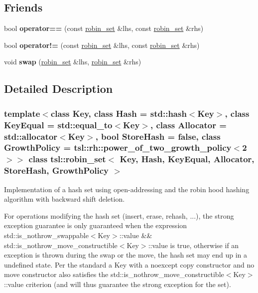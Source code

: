 \subsection*{Friends}
\begin{DoxyCompactItemize}
\item 
\mbox{\label{classtsl_1_1robin__set_a55606bf1468f27f0d3b49785b48259f9}} 
bool {\bfseries operator==} (const \mbox{\hyperlink{classtsl_1_1robin__set}{robin\+\_\+set}} \&lhs, const \mbox{\hyperlink{classtsl_1_1robin__set}{robin\+\_\+set}} \&rhs)
\item 
\mbox{\label{classtsl_1_1robin__set_a76f08c253db4505b664796a57a404ec5}} 
bool {\bfseries operator!=} (const \mbox{\hyperlink{classtsl_1_1robin__set}{robin\+\_\+set}} \&lhs, const \mbox{\hyperlink{classtsl_1_1robin__set}{robin\+\_\+set}} \&rhs)
\item 
\mbox{\label{classtsl_1_1robin__set_aac30ae29e5971fd44ddc98bbdd334c84}} 
void {\bfseries swap} (\mbox{\hyperlink{classtsl_1_1robin__set}{robin\+\_\+set}} \&lhs, \mbox{\hyperlink{classtsl_1_1robin__set}{robin\+\_\+set}} \&rhs)
\end{DoxyCompactItemize}


\subsection{Detailed Description}
\subsubsection*{template$<$class Key, class Hash = std\+::hash$<$\+Key$>$, class Key\+Equal = std\+::equal\+\_\+to$<$\+Key$>$, class Allocator = std\+::allocator$<$\+Key$>$, bool Store\+Hash = false, class Growth\+Policy = tsl\+::rh\+::power\+\_\+of\+\_\+two\+\_\+growth\+\_\+policy$<$2$>$$>$\newline
class tsl\+::robin\+\_\+set$<$ Key, Hash, Key\+Equal, Allocator, Store\+Hash, Growth\+Policy $>$}

Implementation of a hash set using open-\/addressing and the robin hood hashing algorithm with backward shift deletion.

For operations modifying the hash set (insert, erase, rehash, ...), the strong exception guarantee is only guaranteed when the expression {\ttfamily std\+::is\+\_\+nothrow\+\_\+swappable$<$Key$>$\+::value \&\& std\+::is\+\_\+nothrow\+\_\+move\+\_\+constructible$<$Key$>$\+::value} is true, otherwise if an exception is thrown during the swap or the move, the hash set may end up in a undefined state. Per the standard a {\ttfamily Key} with a noexcept copy constructor and no move constructor also satisfies the {\ttfamily std\+::is\+\_\+nothrow\+\_\+move\+\_\+constructible$<$Key$>$\+::value} criterion (and will thus guarantee the strong exception for the set).

